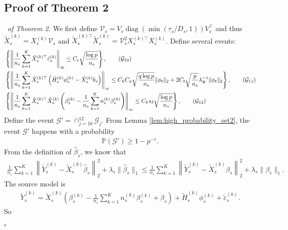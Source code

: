 \documentclass[12pt]{article}
\newenvironment{pf}{{\noindent \it Proof}\ }{\hfill $\square$\par}
\begin{document}
\subsection{Proof of Theorem 2}
\begin{pf}{\it of Theorem 2. }
We first define $\mathcal{V}_s = V_s \operatorname{diag}(\min(\tau_s/D_s,1)) V_s^\top$ and thus $\tilde{X}_s^{(k)} = X^{(k)}_s \mathcal{V}_s$ and $\tilde{X}_s^{(k)\top}\tilde{X}_s^{(k)} = \mathcal{V}_s^2 X_s^{(k)\top}X_s^{(k)}$. Define several events:
\begin{align}
&\left\{\left\|\frac{1}{n_s}\sum_{k=1}^K \tilde{X}_s^{(k)\top} \tilde{\varepsilon}_s^{(k)}\right\|_{\infty}\le C_\varepsilon\sqrt{\frac{\log p}{n_s}} \right\},\label{set:g_10}\tag{$\mathcal{G}_{10}$}\\
&\left\{\left\|\frac{1}{n_s}\sum_{k=1}^K \tilde{X}_s^{(k)\top}\left(\tilde{H}_s^{(k)}\phi_s^{(k)}- \tilde{X}_s^{(k)}b_s\right)\right\|_{\infty}\le C_kC_\phi \sqrt{\frac{q\log p}{n_s}}\|\phi_t\|_2+  2C_t \sqrt{\frac{p}{n_s}}\lambda_\Psi^{-1} \|\phi_t\|_2\right\},\label{set:g_11}\tag{$\mathcal{G}_{11}$}\\
&\left\{\left\|\frac{1}{n_s} \sum_{k=1}^K \tilde{X}_s^{(k)\top}\tilde{X}_s^{(k)}\left(\beta_s^{(k)}-\frac{1}{n_s}\sum_{k=1}^K n_s^{(k)}\beta_s^{(k)}\right)\right\|_{\infty} \le C_k s_\delta \sqrt{\frac{\log p}{n_s}}\right\},\label{set:g_12}\tag{$\mathcal{G}_{12}$}
\end{align}
Define the event $\mathcal{G}' = \cap_{j=10}^{12} \mathcal{G}_j$. From Lemma \ref{lem:high_probability_set2}, the event $\mathcal{G}'$ happens with a probability 
\begin{align*}
    \mathbb{P}\left(\mathcal{G}'\right) \ge 1 - p^{-c}. 
\end{align*}
    From the definition of $\hat{\beta}_s$, we know that 
    \begin{align*}
        \frac{1}{n_s}\sum_{k=1}^K \left\|\tilde{Y}_s^{(k)} - \tilde{X}_s^{(k)}\hat{\beta}_s\right\|_2^2 +\lambda_s\|\hat{\beta}_s\|_1 \le  \frac{1}{n_s}\sum_{k=1}^K \left\|\tilde{Y}_s^{(k)} - \tilde{X}_s^{(k)}\beta_s\right\|_2^2 +\lambda_s\|\beta_s\|_1.
    \end{align*}
    The source model is 
    \begin{align*}
        \tilde{Y}^{(k)}_s = \tilde{X}_s^{(k)}\left(\beta_s^{(k)} - \frac{1}{n_s}\sum_{k=1}^K n_s^{(k)}\beta_s^{(k)}+\beta_s \right) + \tilde{H}_s^{(k)}\phi_s^{(k)} + \tilde{\varepsilon}_s^{(k)}. 
    \end{align*}
     So
    \begin{align}

\end{align}
\end{pf}
\end{document}

